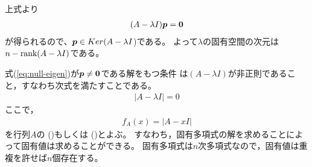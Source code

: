 \documentclass[twocolumn,11pt]{jarticle}
\begin{document}
上式より
\begin{align}
  \label{eq:null-eigen}
  (A-\lambda I)\boldsymbol{p}=\boldsymbol{0}
\end{align}
が得られるので、$\boldsymbol{p}\in Ker (A-\lambda I$)である。
よって$\lambda$の固有空間の次元は$n-\mbox{rank} (A-\lambda I)$である。

式(\ref{eq:null-eigen})が$\boldsymbol{p}\ne\boldsymbol{0}$である解をもつ条件
は$(A-\lambda I)$が非正則であること，すなわち次式を満たすことである。
\begin{align}
|A-\lambda I|=0
\end{align}
ここで，
\begin{align}
f_A(x)=|A-xI|
\end{align}
を行列$A$の
()もしくは
()とよぶ。
すなわち，固有多項式の解を求めることによって固有値は求めることができる。
固有多項式は$n$次多項式なので，固有値は重複を許せば$n$個存在する。
\end{document}
